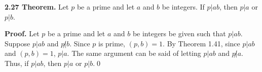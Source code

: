 \documentclass[12pt]{article}
\begin{document}
\noindent\textbf{2.27 Theorem.} Let $p$ be a prime and let $a$ and $b$ be integers. If $p|ab$, then $p|a$ or $p|b$.

\bigskip

\noindent\textbf{Proof.} Let $p$ be a prime and let $a$ and $b$ be integers be given such that $p|ab$. Suppose $p|ab$ and $p\not| b$. Since $p$ is prime, $(p,b)=1$. By Theorem 1.41, since $p|ab$ and $(p,b)=1$, $p|a$. The same argument can be said of letting $p|ab$ and $p\not| a$. Thus, if $p|ab$, then $p|a$ or $p|b$.\qed
\end{document}
